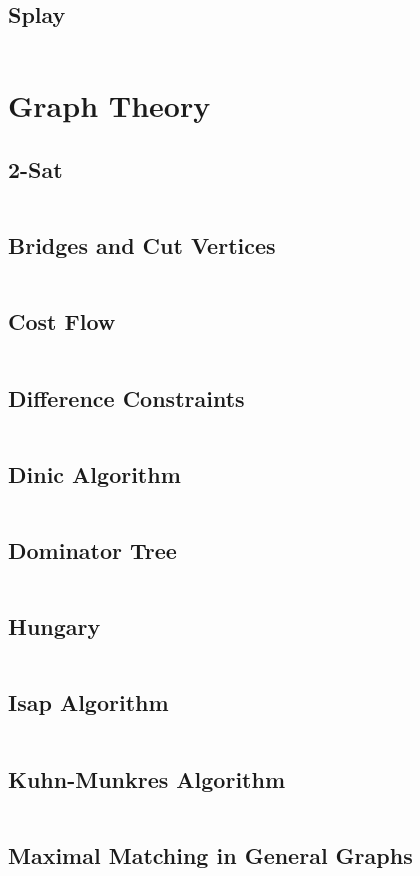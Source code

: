 \documentclass[a4paper,openany]{book}
\newcommand{\cppcode}[1]
{
  \inputminted[mathescape,
  tabsize=4,
  linenos,
  framesep=2mm,
  breakaftergroup=true,
  breakautoindent=true,
  breakbytoken=true,
  breaklines=true,
  fontsize=\small
  ]{cpp}{Source/#1}
}
\begin{document}
\section{Splay}
\cppcode{/Data Structure/Splay.cpp}

\chapter{Graph Theory}
\section{2-Sat}
\cppcode{/Graph Theory/2-Sat.cpp}
\section{Bridges and Cut Vertices}
\cppcode{/Graph Theory/Bridges and Cut Vertices.cpp}
\section{Cost Flow}
\cppcode{/Graph Theory/Cost Flow.cpp}
\section{Difference Constraints}
\cppcode{/Graph Theory/Difference Constraints.cpp}
\section{Dinic Algorithm}
\cppcode{/Graph Theory/Dinic Algorithm.cpp}
\section{Dominator Tree}
\cppcode{/Graph Theory/Dominator Tree.cpp}
\section{Hungary}
\cppcode{/Graph Theory/Hungary.cpp}
\section{Isap Algorithm}
\cppcode{/Graph Theory/Isap Algorithm.cpp}
\section{Kuhn-Munkres Algorithm}
\cppcode{/Graph Theory/Kuhn-Munkres Algorithm.cpp}
\section{Maximal Matching in General Graphs}
\cppcode{/Graph Theory/Maximal Matching in General Graphs.cpp}
\end{document}
